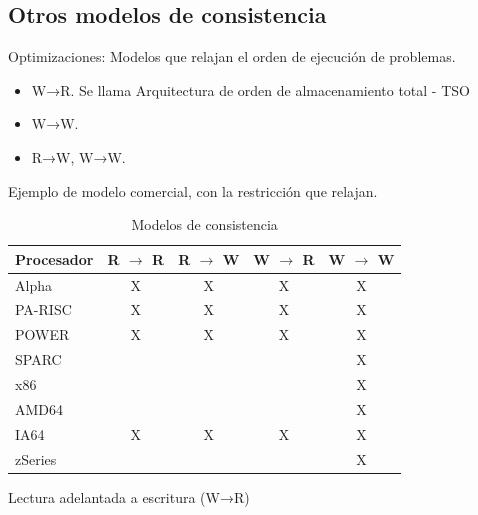 \documentclass[12pt, twoside, openright]{report} %
\begin{document}
\subsection{Otros modelos de consistencia}


Optimizaciones: Modelos que relajan el orden de ejecución de
problemas.

\begin{itemize}

	\item W→R. Se llama Arquitectura de orden de almacenamiento total -
	      TSO
	\item W→W.
	\item R→W, W→W.
\end{itemize}

Ejemplo de modelo comercial, con la restricción que relajan.
\begin{table}[H]
	\centering
	\begin{tabular}{l|c|c|c|c}
		\textbf{Procesador} & \multicolumn{1}{l|}{R $\rightarrow$ R} & \multicolumn{1}{l|}{R $\rightarrow$ W} & \multicolumn{1}{l|}{W $\rightarrow$ R} & \multicolumn{1}{l}{W $\rightarrow$ W} \\ \hline
		Alpha               & X                                      & X                                      & X                                      & X                                     \\ \hline
		PA-RISC             & X                                      & X                                      & X                                      & X                                     \\ \hline
		POWER               & X                                      & X                                      & X                                      & X                                     \\ \hline
		SPARC               &                                        &                                        &                                        & X                                     \\ \hline
		x86                 &                                        &                                        &                                        & X                                     \\ \hline
		AMD64               &                                        &                                        &                                        & X                                     \\ \hline
		IA64                & X                                      & X                                      & X                                      & X                                     \\ \hline
		zSeries             &                                        &                                        &                                        & X                                     \\ \hline
	\end{tabular}
	\caption{Modelos de consistencia}
\end{table}
\pagebreak
Lectura adelantada a escritura (W→R)
\end{document}
